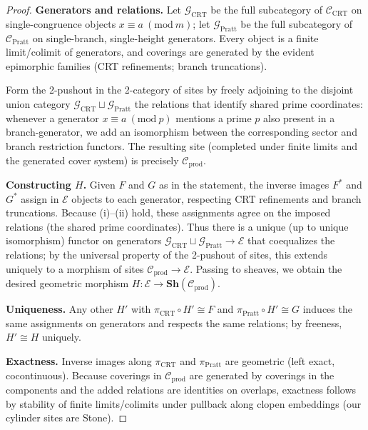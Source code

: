\documentclass[12pt]{article}
\numberwithin{equation}{section}
\begin{document}
\begin{proof}
\textbf{Generators and relations.} Let $\mathcal{G}_{\mathrm{CRT}}$ be the full subcategory of $\mathscr{C}_{\mathrm{CRT}}$ on single-congruence objects $x\equiv a\ (\mathrm{mod}\ m)$; let $\mathcal{G}_{\mathrm{Pratt}}$ be the full subcategory of $\mathscr{C}_{\mathrm{Pratt}}$ on single-branch, single-height generators. Every object is a finite limit/colimit of generators, and coverings are generated by the evident epimorphic families (CRT refinements; branch truncations).

Form the 2-pushout in the 2-category of sites by freely adjoining to the disjoint union category $\mathcal{G}_{\mathrm{CRT}}\sqcup \mathcal{G}_{\mathrm{Pratt}}$ the relations that identify shared prime coordinates: whenever a generator $x\equiv a\ (\mathrm{mod}\ p)$ mentions a prime $p$ also present in a branch-generator, we add an isomorphism between the corresponding sector and branch restriction functors. The resulting site (completed under finite limits and the generated cover system) is precisely $\mathscr{C}_{\mathrm{prod}}$.

\textbf{Constructing $H$.} Given $F$ and $G$ as in the statement, the inverse images $F^\ast$ and $G^\ast$ assign in $\mathcal{E}$ objects to each generator, respecting CRT refinements and branch truncations. Because (i)–(ii) hold, these assignments agree on the imposed relations (the shared prime coordinates). Thus there is a unique (up to unique isomorphism) functor on generators $\mathcal{G}_{\mathrm{CRT}}\sqcup \mathcal{G}_{\mathrm{Pratt}}\to \mathcal{E}$ that coequalizes the relations; by the universal property of the 2-pushout of sites, this extends uniquely to a morphism of sites $\mathscr{C}_{\mathrm{prod}}\to \mathcal{E}$. Passing to sheaves, we obtain the desired geometric morphism $H:\mathcal{E}\to \mathbf{Sh}(\mathscr{C}_{\mathrm{prod}})$.

\textbf{Uniqueness.} Any other $H'$ with $\pi_{\mathrm{CRT}}\circ H'\cong F$ and $\pi_{\mathrm{Pratt}}\circ H'\cong G$ induces the same assignments on generators and respects the same relations; by freeness, $H'\cong H$ uniquely.

\textbf{Exactness.} Inverse images along $\pi_{\mathrm{CRT}}$ and $\pi_{\mathrm{Pratt}}$ are geometric (left exact, cocontinuous). Because coverings in $\mathscr{C}_{\mathrm{prod}}$ are generated by coverings in the components and the added relations are identities on overlaps, exactness follows by stability of finite limits/colimits under pullback along clopen embeddings (our cylinder sites are Stone).
\end{proof}
\end{document}
